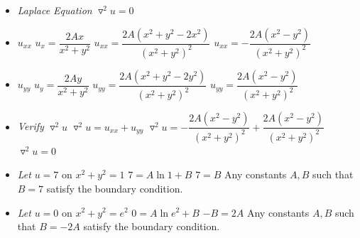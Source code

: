 \documentclass[10pt]{article}
\begin{document}
\begin{itemize}
    \item \textit{Laplace Equation} $ \triangledown^2u = 0 $
    \item  $ u_{xx} $
    \subitem $ \displaystyle u_{x} = \dfrac{2 A x}{x^2+y^2} $
    \subitem $ \displaystyle u_{xx} = \dfrac{2 A \left(x^2+y^2-2x^2\right)}{\left(x^2+y^2\right)^2} $
    \subitem $ \displaystyle u_{xx} = -\dfrac{2 A \left(x^2-y^2\right)}{\left(x^2+y^2\right)^2} $
    \item  $ u_{yy} $
    \subitem $ \displaystyle u_{y} = \dfrac{2 A y}{x^2+y^2} $
    \subitem $ \displaystyle u_{yy} = \dfrac{2 A \left(x^2+y^2-2y^2\right)}{\left(x^2+y^2\right)^2} $
    \subitem $ \displaystyle u_{yy} = \dfrac{2 A \left(x^2-y^2\right)}{\left(x^2+y^2\right)^2} $
    \item \textit{Verify} $ \triangledown^2u $
    \subitem $ \triangledown^2u = u_{xx} + u_{yy} $
    \subitem $ \displaystyle \triangledown^2u =-\dfrac{2 A \left(x^2-y^2\right)}{\left(x^2+y^2\right)^2} + \dfrac{2 A \left(x^2-y^2\right)}{\left(x^2+y^2\right)^2} $
    \subitem  $ \triangledown^2u = 0 $
    \item \textit{Let} $ u = 7 $ on $ x^2 + y^2 = 1 $
    \subitem $ 7 = A\ln{1} + B $
    \subitem $ 7 = B $
    \subitem Any constants $ A,B $ such that $ B=7 $ satisfy the boundary condition.
    \item \textit{Let} $ u = 0 $ on $ x^2 + y^2 = e^2 $
    \subitem $ 0 = A\ln{e^2} + B $
    \subitem $ -B = 2A $
    \subitem Any constants $ A,B $ such that $ B=-2A $ satisfy the boundary condition.
\end{itemize}

\newpage
\end{document}
